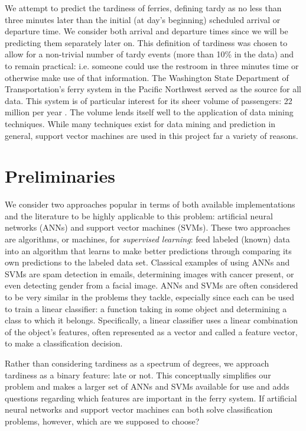 \documentclass[11pt]{article} %
\begin{document}
We attempt to predict the tardiness of ferries, defining tardy 
as no less than three minutes later than the initial (at day's beginning) 
scheduled arrival or departure time. We consider both arrival and departure 
times since we will be predicting them separately later on. This definition
of tardiness was chosen to allow for a non-trivial number of tardy events 
(more than 10\% in the data) and to remain practical: i.e. someone could use the
restroom in three minutes time or otherwise make use of that information. The 
Washington State Department of Transportation's ferry system in the Pacific
Northwest served as the source for all data. This system is of 
particular interest for its sheer volume of passengers: 22 million per year 
\cite{wsfTraffic}.  The volume lends itself well to the application of 
data mining techniques. While many techniques exist for data mining and 
prediction in general, support vector machines are used in this project far a 
variety of reasons.


\section{Preliminaries}
\label{sec:prelims}
We consider two approaches popular in terms of both available implementations and 
the literature to be highly applicable to this problem:
artificial neural networks (ANNs) and support vector machines (SVMs). These two 
approaches are algorithms, or machines, for
\textit{supervised learning}: feed labeled (known) data into an
algorithm that learns to make better predictions through comparing its own 
predictions to the labeled data set. Classical examples of using ANNs and SVMs are
spam detection in emails, determining images with cancer present, or even
detecting gender from a facial image. ANNs and SVMs are often considered to be
very similar in the problems they tackle, especially since each can
be used to train a linear classifier: a function taking in some object and 
determining a class to which it belongs. Specifically, a linear classifier uses
a linear combination of the object's features, often represented as a vector and
called a feature vector, to make a classification decision.

Rather than considering tardiness as a 
spectrum of degrees, we approach tardiness as a binary feature: late or not. This 
conceptually simplifies our problem and makes a larger set of ANNs and SVMs 
available for use and adds questions regarding which features are important in 
the ferry system. 
If artificial neural networks and support vector machines 
can both solve classification problems, however, which are we supposed to choose?
\end{document}
